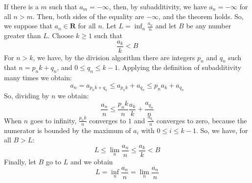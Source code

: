 \documentclass[12pt]{article}
\begin{document}
If there is a $m$ such that $a_m=-\infty$, then, by subadditivity, we have $a_n=-\infty$ for all $n>m$. Then, both sides of the equality are $-\infty$, and the theorem holds.
So, we suppose that $a_n \in \textbf{R}$ for all $n$. Let $L=\inf_n \frac{a_n}{n}$ and let $B$ be any number greater than $L$. Choose $k\geq 1$ such that 
$$\frac{a_k}{k}<B$$
For $n>k$, we have, by the division algorithm there are integers $p_n$ and $q_n$ such that $n=p_nk+q_n$, and $0\leq q_n \leq k-1$.
Applying the definition of subadditivity many times we obtain:
$$a_n=a_{p_nk+q_n}\leq a_{p_nk}+a_{q_n} \leq p_na_k+a_{q_n}$$
So, dividing by $n$ we obtain:
$$ \frac{a_n}{n} \leq \frac{p_nk}{n} \frac{a_k}{k}+\frac{a_{q_n}}{n}$$
When $n$ goes to infinity, $\frac{p_nk}{n}$ converges to $1$ and $\frac{a_{q_n}}{n}$ converges to zero, because the numerator is bounded by the maximum of $a_i$ with $0\leq i \leq k-1$. So, we have, for all $B>L$:
$$L\leq \lim_n \frac{a_n}{n} \leq \frac{a_k}{k} < B$$
Finally, let $B$ go to $L$ and we obtain
$$L=\inf_n \frac{a_n}{n}=\lim_n \frac{a_n}{n}$$
\end{document}
